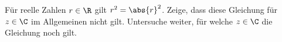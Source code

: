 \begin{exercise}
  Für reelle Zahlen $r \in \R$ gilt $r^2 = \abs{r}^2$. Zeige, dass diese
  Gleichung für $z \in \C$ im Allgemeinen nicht gilt. Untersuche weiter, für
  welche $z \in \C$ die Gleichung noch gilt.
\end{exercise}
